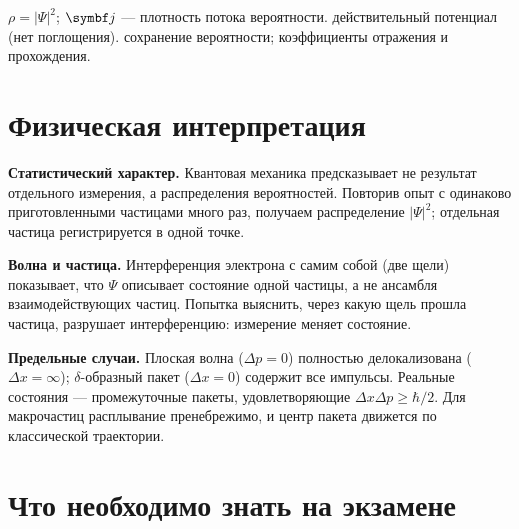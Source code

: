  {$\rho=|\Psi|^2$; $\vect j$ — плотность потока вероятности.}
 {действительный потенциал (нет поглощения).}
 {сохранение вероятности; коэффициенты отражения и прохождения.}

\section{Физическая интерпретация}

\textbf{Статистический характер.} Квантовая механика предсказывает не результат отдельного
измерения, а распределения вероятностей. Повторив опыт с одинаково приготовленными частицами
много раз, получаем распределение $|\Psi|^2$; отдельная частица регистрируется в одной точке.

\textbf{Волна и частица.} Интерференция электрона с самим собой (две щели) показывает, что
$\Psi$ описывает состояние одной частицы, а не ансамбля взаимодействующих частиц. Попытка
выяснить, через какую щель прошла частица, разрушает интерференцию: измерение меняет
состояние.

\textbf{Предельные случаи.} Плоская волна ($\Delta p=0$) полностью делокализована ($\Delta x=\infty$);
$\delta$-образный пакет ($\Delta x=0$) содержит все импульсы. Реальные состояния — промежуточные
пакеты, удовлетворяющие $\Delta x\Delta p\ge\hbar/2$. Для макрочастиц расплывание пренебрежимо, и
центр пакета движется по классической траектории.

\section{Что необходимо знать на экзамене}

